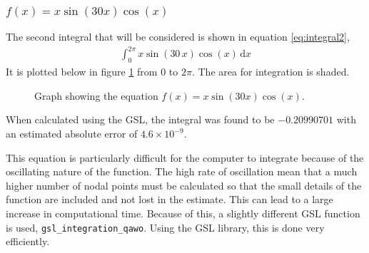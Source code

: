 \documentclass[11pt]{article} %
\newcommand{\inputTikZ}[1]{%
  }
\newcommand{\inputTikZ}[1]{%
    \beginpgfgraphicnamed{#1-external}%
    \endpgfgraphicnamed%
  }
\renewcommand{\d}{\,\mathrm{d}} %
\newcommand{\code}[1]{\texttt{#1}}
\begin{document}
	\subsubsection{$f(x) = x\sin(30x)\cos(x)$}
	The second integral that will be considered is shown in equation \ref{eq:integral2},
	\begin{align}
		\int_0^{2\pi} x\sin(30\,x)\cos(x)\d{x} \label{eq:integral2}
	\end{align}
	It is plotted below in figure \ref{fig:graph2} from $0$ to $2\pi$. The area for integration is shaded.
	\begin{figure}[h]
		\centering
			\inputTikZ{Graph2}
		\caption{\label{fig:graph2}Graph showing the equation $f(x) = x\sin(30x)\cos(x)$.}
	\end{figure}
	
	When calculated using the GSL, the integral was found to be $-0.20990701$ with an estimated absolute error of $4.6\times10^{-9}$.

	This equation is particularly difficult for the computer to integrate because of the oscillating nature of the function. The high rate of oscillation mean that a much higher number of nodal points must be calculated so that the small details of the function are included and not lost in the estimate. This can lead to a large increase in computational time. Because of this, a slightly different GSL function is used, \code{gsl\_integration\_qawo}. Using the GSL library, this is done very efficiently. 
\end{document}
